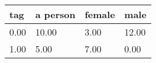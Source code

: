 \begin{tabular}{llll}
\toprule
tag & a person & female & male \\
\midrule
0.00 & 10.00 & 3.00 & 12.00 \\
1.00 & 5.00 & 7.00 & 0.00 \\
\bottomrule
\end{tabular}
